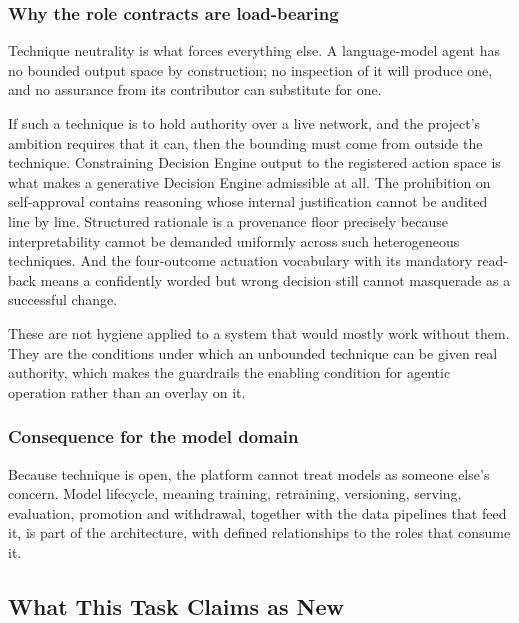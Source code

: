 \hypertarget{why-the-role-contracts-are-load-bearing}{%
\subsubsection{Why the role contracts are load-bearing}\label{why-the-role-contracts-are-load-bearing}}

Technique neutrality is what forces everything else. A language-model
agent has no bounded output space by construction; no inspection of it
will produce one, and no assurance from its contributor can substitute
for one.

If such a technique is to hold authority over a live network, and the
project's ambition requires that it can, then the bounding must come
from outside the technique. Constraining Decision Engine output to the
registered action space is what makes a generative Decision Engine
admissible at all. The prohibition on self-approval contains reasoning
whose internal justification cannot be audited line by line. Structured
rationale is a provenance floor precisely because interpretability
cannot be demanded uniformly across such heterogeneous techniques. And
the four-outcome actuation vocabulary with its mandatory read-back means
a confidently worded but wrong decision still cannot masquerade as a
successful change.

These are not hygiene applied to a system that would mostly work without
them. They are the conditions under which an unbounded technique can be
given real authority, which makes the guardrails the enabling condition
for agentic operation rather than an overlay on it.

\hypertarget{consequence-for-the-model-domain}{%
\subsubsection{Consequence for the model domain}\label{consequence-for-the-model-domain}}

Because technique is open, the platform cannot treat models as someone
else's concern. Model lifecycle, meaning training, retraining,
versioning, serving, evaluation, promotion and withdrawal, together with
the data pipelines that feed it, is part of the architecture, with
defined relationships to the roles that consume it.

\hypertarget{what-this-task-claims-as-new}{%
\subsection{What This Task Claims as New}\label{what-this-task-claims-as-new}}

